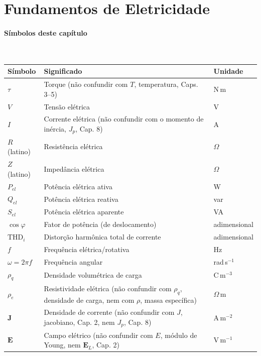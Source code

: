 \documentclass[12pt,a4paper]{article}
\numberwithin{equation}{section}
\numberwithin{table}{section}
\numberwithin{figure}{section}
\begin{document}
\section{Fundamentos de Eletricidade}\label{sec:eletrica}

\paragraph{Símbolos deste capítulo}\mbox{}\\[-0.5em]
{\small
\begin{longtable}{>{\raggedright\arraybackslash}p{2.6cm} >{\raggedright\arraybackslash}p{9.2cm} >{\raggedright\arraybackslash}p{2.6cm}}
	\toprule
	\textbf{Símbolo} & \textbf{Significado} & \textbf{Unidade} \\ \midrule
	\endhead
	$\tau$ & Torque (não confundir com $T$, temperatura, Caps. 3--5) & N\,m \\
	$V$ & Tensão elétrica & V \\
	$I$ & Corrente elétrica (não confundir com o momento de inércia, $J_p$, Cap. 8) & A \\
	$R$ (latino) & Resistência elétrica & $\Omega$ \\
	$Z$ (latino) & Impedância elétrica & $\Omega$ \\
	$P_{el}$ & Potência elétrica ativa & W \\
	$Q_{el}$ & Potência elétrica reativa & var \\
	$S_{el}$ & Potência elétrica aparente & VA \\
	$\cos\varphi$ & Fator de potência (de deslocamento) & adimensional \\
	$\mathrm{THD}_i$ & Distorção harmônica total de corrente & adimensional \\
	$f$ & Frequência elétrica/rotativa & Hz \\
	$\omega = 2\pi f$ & Frequência angular & rad\,s$^{-1}$ \\
	$\rho_q$ & Densidade volumétrica de carga & C\,m$^{-3}$ \\
	$\rho_e$ & Resistividade elétrica (não confundir com $\rho_q$, densidade de carga, nem com $\rho$, massa específica) & $\Omega$\,m \\
	$\mathbf{J}$ & Densidade de corrente (não confundir com $J$, jacobiano, Cap. 2, nem $J_p$, Cap. 8) & A\,m$^{-2}$ \\
	$\mathbf{E}$ & Campo elétrico (não confundir com $E$, módulo de Young, nem $\mathbf{E}_L$, Cap. 2) & V\,m$^{-1}$ \\

\end{longtable}}
\end{document}
